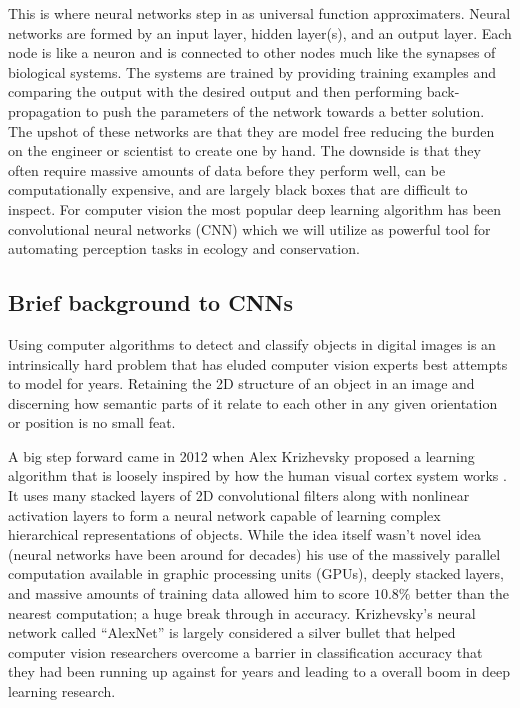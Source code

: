 This is where neural networks step in as universal function approximaters. Neural networks are formed by an input layer, hidden layer(s), and an output layer. Each node is like a neuron and is connected to other nodes much like the synapses of biological systems. The systems are trained by providing training examples and comparing the output with the desired output and then performing back-propagation to push the parameters of the network towards a better solution. The upshot of these networks are that they are model free reducing the burden on the engineer or scientist to create one by hand. The downside is that they often require massive amounts of data before they perform well, can be computationally expensive, and are largely black boxes that are difficult to inspect. For computer vision the most popular deep learning algorithm has been convolutional neural networks (CNN) which we will utilize as powerful tool for automating perception tasks in ecology and conservation.

\subsection{Brief background to CNNs}

Using computer algorithms to detect and classify objects in digital images is an intrinsically hard problem that has eluded computer vision experts best attempts to model for years. Retaining the 2D structure of an object in an image and discerning how semantic parts of it relate to each other in any given orientation or position is no small feat.

A big step forward came in 2012 when Alex Krizhevsky proposed a learning algorithm that is loosely inspired by how the human visual cortex system works \cite{AlexNet}. It uses many stacked layers of 2D convolutional filters along with nonlinear activation layers to form a neural network capable of learning complex hierarchical representations of objects. While the idea itself wasn't novel idea (neural networks have been around for decades) his use of the massively parallel computation available in graphic processing units (GPUs), deeply stacked layers, and massive amounts of training data allowed him to score $10.8\%$ better than the nearest computation; a huge break through in accuracy. Krizhevsky’s neural network called “AlexNet” is largely considered a silver bullet that helped computer vision researchers overcome a barrier in classification accuracy that they had been running up against for years and leading to a overall boom in deep learning research.


